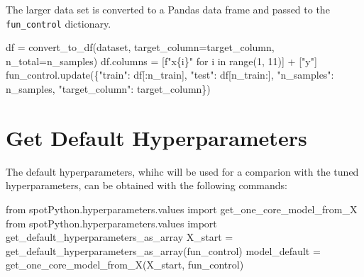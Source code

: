 \documentclass[
  letterpaper,
  DIV=11,
  numbers=noendperiod]{scrreprt}
\newenvironment{Shaded}{\begin{snugshade}}{\end{snugshade}}
\newcommand{\BuiltInTok}[1]{\textcolor[rgb]{0.00,0.23,0.31}{#1}}
\newcommand{\ControlFlowTok}[1]{\textcolor[rgb]{0.00,0.23,0.31}{#1}}
\newcommand{\DecValTok}[1]{\textcolor[rgb]{0.68,0.00,0.00}{#1}}
\newcommand{\ImportTok}[1]{\textcolor[rgb]{0.00,0.46,0.62}{#1}}
\newcommand{\KeywordTok}[1]{\textcolor[rgb]{0.00,0.23,0.31}{#1}}
\newcommand{\NormalTok}[1]{\textcolor[rgb]{0.00,0.23,0.31}{#1}}
\newcommand{\OperatorTok}[1]{\textcolor[rgb]{0.37,0.37,0.37}{#1}}
\newcommand{\SpecialCharTok}[1]{\textcolor[rgb]{0.37,0.37,0.37}{#1}}
\newcommand{\SpecialStringTok}[1]{\textcolor[rgb]{0.13,0.47,0.30}{#1}}
\newcommand{\StringTok}[1]{\textcolor[rgb]{0.13,0.47,0.30}{#1}}
\begin{document}
The larger data set is converted to a Pandas data frame and passed to
the \texttt{fun\_control} dictionary.

\begin{Shaded}
\begin{Highlighting}[]
\NormalTok{df }\OperatorTok{=}\NormalTok{ convert\_to\_df(dataset, target\_column}\OperatorTok{=}\NormalTok{target\_column, n\_total}\OperatorTok{=}\NormalTok{n\_samples)}
\NormalTok{df.columns }\OperatorTok{=}\NormalTok{ [}\SpecialStringTok{f"x}\SpecialCharTok{\{}\NormalTok{i}\SpecialCharTok{\}}\SpecialStringTok{"} \ControlFlowTok{for}\NormalTok{ i }\KeywordTok{in} \BuiltInTok{range}\NormalTok{(}\DecValTok{1}\NormalTok{, }\DecValTok{11}\NormalTok{)] }\OperatorTok{+}\NormalTok{ [}\StringTok{"y"}\NormalTok{]}
\NormalTok{fun\_control.update(\{}\StringTok{"train"}\NormalTok{: df[:n\_train],}
                    \StringTok{"test"}\NormalTok{: df[n\_train:],}
                    \StringTok{"n\_samples"}\NormalTok{: n\_samples,}
                    \StringTok{"target\_column"}\NormalTok{: target\_column\})}
\end{Highlighting}
\end{Shaded}

\hypertarget{get-default-hyperparameters-1}{%
\section{Get Default
Hyperparameters}\label{get-default-hyperparameters-1}}

The default hyperparameters, whihc will be used for a comparion with the
tuned hyperparameters, can be obtained with the following commands:

\begin{Shaded}
\begin{Highlighting}[]
\ImportTok{from}\NormalTok{ spotPython.hyperparameters.values }\ImportTok{import}\NormalTok{ get\_one\_core\_model\_from\_X}
\ImportTok{from}\NormalTok{ spotPython.hyperparameters.values }\ImportTok{import}\NormalTok{ get\_default\_hyperparameters\_as\_array}
\NormalTok{X\_start }\OperatorTok{=}\NormalTok{ get\_default\_hyperparameters\_as\_array(fun\_control)}
\NormalTok{model\_default }\OperatorTok{=}\NormalTok{ get\_one\_core\_model\_from\_X(X\_start, fun\_control)}
\end{Highlighting}
\end{Shaded}
\end{document}
